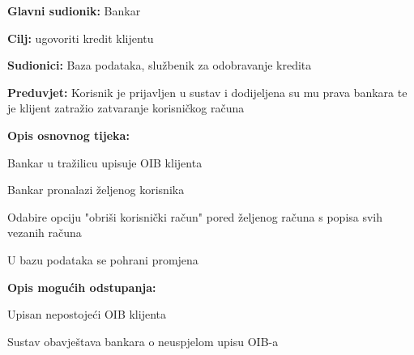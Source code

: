            	\noindent {}
            	\begin{packed_item}
            		
            		\item \textbf{Glavni sudionik: }Bankar
            		\item  \textbf{Cilj:} ugovoriti kredit klijentu
            		\item  \textbf{Sudionici:} Baza podataka, službenik za odobravanje kredita
            		\item  \textbf{Preduvjet:} Korisnik je prijavljen u sustav i dodijeljena su mu prava bankara te je klijent zatražio zatvaranje korisničkog računa
            		\item  \textbf{Opis osnovnog tijeka:}
            		
            		\item[] \begin{packed_enum}
            			
            			\item Bankar u tražilicu upisuje OIB klijenta
            			\item Bankar pronalazi željenog korisnika
            			\item Odabire opciju "obriši korisnički račun" pored željenog računa s popisa svih vezanih računa
            			\item U bazu podataka se pohrani promjena
            		\end{packed_enum}
            		
            		\item  \textbf{Opis mogućih odstupanja:} 
            		
            		\item[] \begin{packed_item}
            			
            			\item[1.a] Upisan nepostojeći OIB klijenta
            			\item[] \begin{packed_enum}
            				
            				\item Sustav obavještava bankara o neuspjelom upisu OIB-a
            				
            			\end{packed_enum}
            			
            		\end{packed_item}
            	\end{packed_item}            
            
